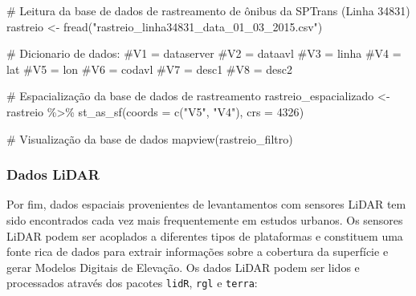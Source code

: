 \documentclass[
  letterpaper,
  DIV=11,
  numbers=noendperiod]{scrreprt}
\newenvironment{Shaded}{\begin{snugshade}}{\end{snugshade}}
\newcommand{\AttributeTok}[1]{\textcolor[rgb]{0.40,0.45,0.13}{#1}}
\newcommand{\CommentTok}[1]{\textcolor[rgb]{0.37,0.37,0.37}{#1}}
\newcommand{\DecValTok}[1]{\textcolor[rgb]{0.68,0.00,0.00}{#1}}
\newcommand{\FunctionTok}[1]{\textcolor[rgb]{0.28,0.35,0.67}{#1}}
\newcommand{\NormalTok}[1]{\textcolor[rgb]{0.00,0.23,0.31}{#1}}
\newcommand{\OtherTok}[1]{\textcolor[rgb]{0.00,0.23,0.31}{#1}}
\newcommand{\SpecialCharTok}[1]{\textcolor[rgb]{0.37,0.37,0.37}{#1}}
\newcommand{\StringTok}[1]{\textcolor[rgb]{0.13,0.47,0.30}{#1}}
\begin{document}
\begin{Shaded}
\begin{Highlighting}[]
\CommentTok{\# Leitura da base de dados de rastreamento de ônibus da SPTrans (Linha 34831)}
\NormalTok{ rastreio }\OtherTok{\textless{}{-}} \FunctionTok{fread}\NormalTok{(}\StringTok{"rastreio\_linha34831\_data\_01\_03\_2015.csv"}\NormalTok{)}

\CommentTok{\# Dicionario de dados:}
 \CommentTok{\#V1 = \textquotesingle{}dataserver\textquotesingle{}}
 \CommentTok{\#V2 = \textquotesingle{}dataavl\textquotesingle{}}
 \CommentTok{\#V3 = \textquotesingle{}linha\textquotesingle{} }
 \CommentTok{\#V4 = \textquotesingle{}lat\textquotesingle{}}
 \CommentTok{\#V5 = \textquotesingle{}lon\textquotesingle{} }
 \CommentTok{\#V6 = \textquotesingle{}codavl\textquotesingle{} }
 \CommentTok{\#V7 = \textquotesingle{}desc1\textquotesingle{} }
 \CommentTok{\#V8 = \textquotesingle{}desc2\textquotesingle{}}
 
\CommentTok{\# Espacialização da base de dados de rastreamento}
\NormalTok{rastreio\_espacializado }\OtherTok{\textless{}{-}}\NormalTok{ rastreio }\SpecialCharTok{\%\textgreater{}\%}
  \FunctionTok{st\_as\_sf}\NormalTok{(}\AttributeTok{coords =} \FunctionTok{c}\NormalTok{(}\StringTok{"V5"}\NormalTok{, }\StringTok{"V4"}\NormalTok{), }\AttributeTok{crs =} \DecValTok{4326}\NormalTok{) }

\CommentTok{\# Visualização da base de dados}
\FunctionTok{mapview}\NormalTok{(rastreio\_filtro)}
\end{Highlighting}
\end{Shaded}

\subsubsection{\texorpdfstring{\textbf{Dados
LiDAR}}{Dados LiDAR}}\label{dados-lidar}

Por fim, dados espaciais provenientes de levantamentos com sensores
LiDAR tem sido encontrados cada vez mais frequentemente em estudos
urbanos. Os sensores LiDAR podem ser acoplados a diferentes tipos de
plataformas e constituem uma fonte rica de dados para extrair
informações sobre a cobertura da superfície e gerar Modelos Digitais de
Elevação. Os dados LiDAR podem ser lidos e processados através dos
pacotes \texttt{lidR}, \texttt{rgl} e \texttt{terra}:
\end{document}
